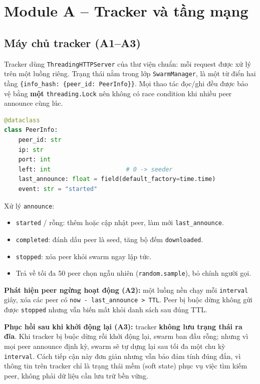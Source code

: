 \documentclass[12pt,a4paper,oneside]{report}
\begin{document}
\section{Module A -- Tracker và tầng mạng}

\subsection{Máy chủ tracker (A1--A3)}
Tracker dùng \texttt{ThreadingHTTPServer} của thư viện chuẩn: mỗi request được xử lý trên một luồng riêng. Trạng thái nằm trong lớp \texttt{SwarmManager}, là một từ điển hai tầng \texttt{\{info\_hash: \{peer\_id: PeerInfo\}\}}. Mọi thao tác đọc/ghi đều được bảo vệ bằng \textbf{một} \texttt{threading.Lock} nên không có race condition khi nhiều peer announce cùng lúc.

\begin{lstlisting}[language=Python]
@dataclass
class PeerInfo:
    peer_id: str
    ip: str
    port: int
    left: int                     # 0 -> seeder
    last_announce: float = field(default_factory=time.time)
    event: str = "started"
\end{lstlisting}

Xử lý \texttt{announce}:
\begin{itemize}
  \item \texttt{started} / rỗng: thêm hoặc cập nhật peer, làm mới \texttt{last\_announce}.
  \item \texttt{completed}: đánh dấu peer là seed, tăng bộ đếm \texttt{downloaded}.
  \item \texttt{stopped}: xóa peer khỏi swarm ngay lập tức.
  \item Trả về tối đa 50 peer chọn ngẫu nhiên (\texttt{random.sample}), bỏ chính người gọi.
\end{itemize}

\textbf{Phát hiện peer ngừng hoạt động (A2):} một luồng nền chạy mỗi \texttt{interval} giây, xóa các peer có \texttt{now - last\_announce > TTL}. Peer bị buộc dừng không gửi được \texttt{stopped} nhưng vẫn biến mất khỏi danh sách sau đúng TTL.

\textbf{Phục hồi sau khi khởi động lại (A3):} tracker \textbf{không lưu trạng thái ra đĩa}. Khi tracker bị buộc dừng rồi khởi động lại, swarm ban đầu rỗng; nhưng vì mọi peer announce định kỳ, swarm sẽ tự dựng lại sau tối đa một chu kỳ \texttt{interval}. Cách tiếp cận này đơn giản nhưng vẫn bảo đảm tính đúng đắn, vì thông tin trên tracker chỉ là trạng thái mềm (soft state) phục vụ việc tìm kiếm peer, không phải dữ liệu cần lưu trữ bền vững.
\end{document}
